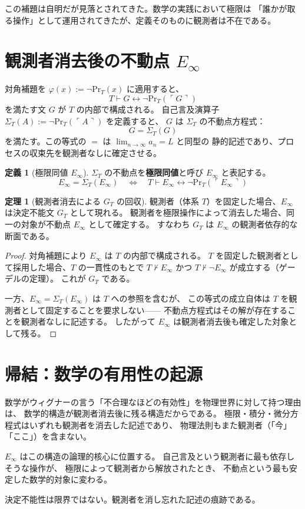 \documentclass[11pt,a4paper]{article}
\theoremstyle{definition}
\newtheorem{definition}{定義}[section]
\newtheorem{theorem}{定理}[section]
\newcommand{\Einfty}{E_\infty}
\newcommand{\SelfRef}{\Sigma}
\renewcommand{\Pr}{\mathrm{Pr}}
\begin{document}
この補題は自明だが見落とされてきた。数学の実践において極限は
「誰かが取る操作」として運用されてきたが、定義そのものに観測者は不在である。

\section{観測者消去後の不動点 $\Einfty$}

対角補題を $\varphi(x) := \neg \Pr_T(x)$ に適用すると、
$$T \vdash G \leftrightarrow \neg \Pr_T(\ulcorner G \urcorner)$$
を満たす文 $G$ が $T$ の内部で構成される。
自己言及演算子 $\SelfRef_T(A) := \neg \Pr_T(\ulcorner A \urcorner)$ を定義すると、
$G$ は $\SelfRef_T$ の不動点方程式：
$$G = \SelfRef_T(G)$$
を満たす。この等式の $=$ は $\lim_{n\to\infty} a_n = L$ と同型の
静的記述であり、プロセスの収束先を観測者なしに確定させる。

\begin{definition}[極限同値 $\Einfty$]
$\SelfRef_T$ の不動点を\textbf{極限同値}と呼び $\Einfty$ と表記する。
$$\Einfty = \SelfRef_T(\Einfty)
\quad \Longleftrightarrow \quad
T \vdash \Einfty \leftrightarrow \neg \Pr_T(\ulcorner \Einfty \urcorner)$$
\end{definition}

\begin{theorem}[観測者消去による $G_T$ の回収]
観測者（体系 $T$）を固定した場合、$\Einfty$ は決定不能文 $G_T$ として現れる。
観測者を極限操作によって消去した場合、同一の対象が不動点 $\Einfty$ として確定する。
すなわち $G_T$ は $\Einfty$ の観測者依存的な断面である。
\end{theorem}

\begin{proof}
対角補題により $\Einfty$ は $T$ の内部で構成される。
$T$ を固定した観測者として採用した場合、$T$ の一貫性のもとで
$T \nvdash \Einfty$ かつ $T \nvdash \neg \Einfty$ が成立する（ゲーデルの定理）。
これが $G_T$ である。

一方、$\Einfty = \SelfRef_T(\Einfty)$ は $T$ への参照を含むが、
この等式の成立自体は $T$ を観測者として固定することを要求しない——
不動点方程式はその解が存在することを観測者なしに記述する。
したがって $\Einfty$ は観測者消去後も確定した対象として残る。
\end{proof}

\section{帰結：数学の有用性の起源}

数学がウィグナーの言う「不合理なほどの有効性」を物理世界に対して持つ理由は、
数学的構造が観測者消去後に残る構造だからである。
極限・積分・微分方程式はいずれも観測者を消去した記述であり、
物理法則もまた観測者（「今」「ここ」）を含まない。

$\Einfty$ はこの構造の論理的核心に位置する。
自己言及という観測者に最も依存しそうな操作が、
極限によって観測者から解放されたとき、
不動点という最も安定した数学的対象に変わる。

決定不能性は限界ではない。観測者を消し忘れた記述の痕跡である。
\end{document}
